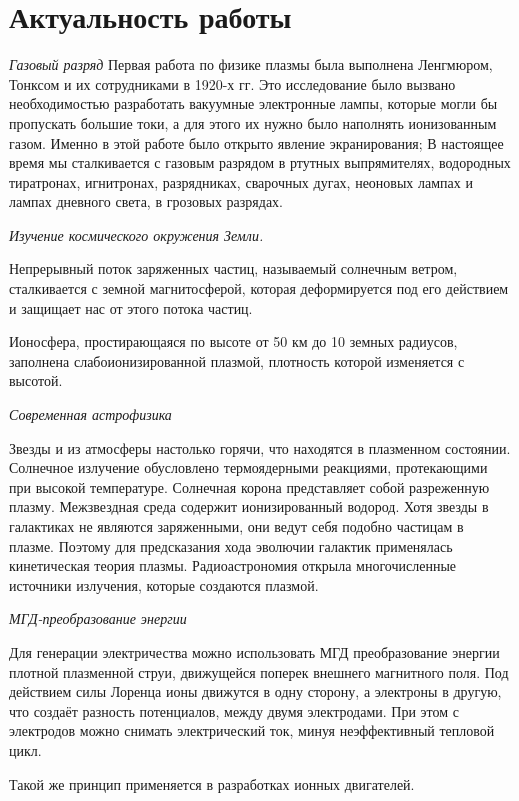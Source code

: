 



\section{Актуальность работы} %
\textit{Газовый разряд}
Первая работа по физике плазмы была выполнена Ленгмюром, Тонксом и их сотрудниками в 1920-х гг. Это исследование было вызвано
необходимостью разработать вакуумные электронные лампы, 
которые могли бы пропускать большие токи, а для этого их нужно
было наполнять ионизованным газом. Именно в этой работе
было открыто явление экранирования; В настоящее время мы сталкивается с газовым разрядом
в ртутных выпрямителях, водородных тиратронах, игнитронах,
разрядниках, сварочных дугах, неоновых лампах и лампах 
дневного света, в грозовых разрядах.


\textit{Изучение космического окружения Земли.}

Непрерывный поток заряженных частиц, называемый солнечным ветром,
сталкивается с земной магнитосферой, которая деформируется под его действием и защищает нас от этого потока частиц.

Ионосфера, простирающаяся по высоте от 50 км до 10 земных радиусов, заполнена слабоионизированной плазмой, плотность которой изменяется с высотой. 

\textit{Современная астрофизика}

Звезды и из атмосферы настолько горячи, что находятся в плазменном состоянии. Солнечное излучение обусловлено термоядерными реакциями, протекающими при высокой температуре. Солнечная корона представляет собой разреженную плазму. Межзвездная среда содержит ионизированный водород. 
Хотя звезды в галактиках не являются заряженными, они ведут себя подобно частицам в плазме. Поэтому для предсказания хода эволючии галактик применялась кинетическая теория плазмы. Радиоастрономия открыла многочисленные источники излучения, которые создаются плазмой. 

\textit{МГД-преобразование энергии}

Для генерации электричества можно использовать МГД преобразование энергии плотной плазменной струи, движущейся поперек внешнего магнитного поля. Под действием силы Лоренца ионы движутся в одну сторону, а электроны в другую, что создаёт разность потенциалов, между двумя электродами. При этом с электродов можно снимать электрический ток, минуя неэффективный тепловой цикл.

Такой же принцип применяется в разработках ионных двигателей.

